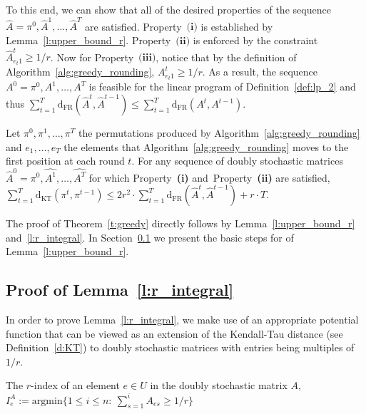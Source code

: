 \documentclass[a4paper,UKenglish,cleveref,autoref, thm-restate]{lipics-v2019}
\def\dkt{\mathrm{d}_{\mathrm{KT}}}
\def\dfr{\mathrm{d}_{\mathrm{FR}}}
\begin{document}
To this end, we can show that all of the desired properties of the sequence $\hat{A} = \pi^0,\hat{A}^1,\ldots,\hat{A}^T$
are satisfied. Property~$\textbf{(i)}$ is established by Lemma~\ref{l:upper_bound_r}. Property~$\textbf{(ii)}$ is enforced by the constraint $\hat{A}_{e_t 1}^t \geq 1/r$. Now for Property~$\textbf{(iii)}$, notice that by the definition of Algorithm~\ref{alg:greedy_rounding}, $A_{e_t 1}^t \geq 1/r$. As a result, the sequence $A^0=\pi^0,A^1,\ldots,A^T$ is feasible for the linear program of Definition~\ref{def:lp_2} and thus $\sum_{t=1}^T \dfr(\hat{A}^t,\hat{A}^{t-1}) \leq \sum_{t=1}^T \dfr(A^t,A^{t-1})$.

\begin{lemma}\label{l:r_integral}
Let $\pi^0,\pi^1,\ldots,\pi^T$ the permutations produced by Algorithm~\ref{alg:greedy_rounding} and $e_1,\ldots,e_T$ the elements that Algorithm~\ref{alg:greedy_rounding} moves to the first position at each round $t$. For any sequence of doubly stochastic matrices $\hat{A}^0 = \pi^0,\hat{A^1},\ldots,\hat{A^T}$ for which Property~\textbf{(i)} and~Property~\textbf{(ii)} are satisfied, $\sum_{t=1}^T \dkt(\pi^t,\pi^{t-1}) \leq 2r^2 \cdot  \sum_{t=1}^T \dfr(\hat{A}^t,\hat{A}^{t-1}) + r \cdot T$.
\end{lemma}
\noindent The proof of Theorem~\ref{t:greedy} directly follows by Lemma~\ref{l:upper_bound_r} and~\ref{l:r_integral}. In Section~\ref{sub:greedy_1} we present the basic steps for of Lemma~\ref{l:upper_bound_r}.
\subsection{Proof of Lemma~\ref{l:r_integral}}\label{sub:greedy_1}
In order to prove Lemma~\ref{l:r_integral}, we make use of an appropriate potential function that can be viewed as an extension of the Kendall-Tau distance (see Definition~\ref{d:KT}) to doubly stochastic matrices with entries being multiples of $1/r$.
\begin{definition}
The $r$-index of an element $e \in U$ in the doubly stochastic matrix $A$, $I_e^A:=\mathrm{argmin}\{1\leq i \leq n:~ \sum_{s=1}^i A_{es} \geq 1/r\}$
\end{definition}
\end{document}
